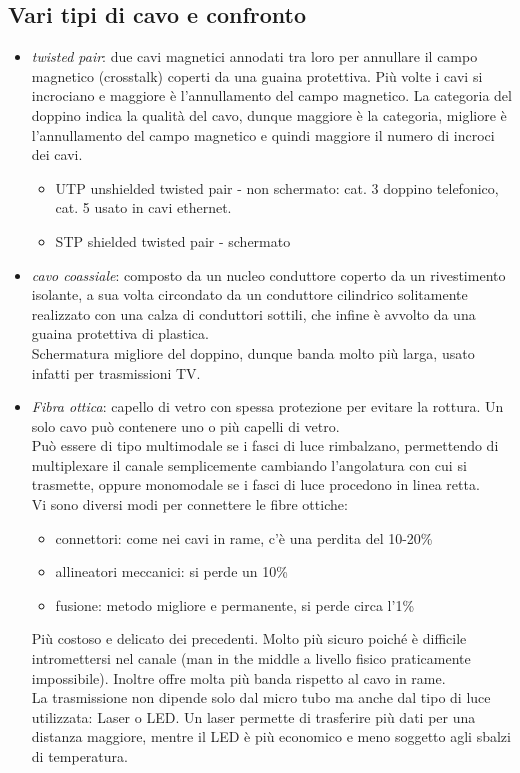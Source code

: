 \documentclass[10pt,a4paper,twoside]{article}
\begin{document}
\subsection{Vari tipi di cavo e confronto}
\begin{itemize}
\item \textit{twisted pair}: due cavi magnetici annodati tra loro per annullare il campo magnetico (crosstalk) coperti da una guaina protettiva. Più volte i cavi si incrociano e maggiore è l'annullamento del campo magnetico. La categoria del doppino indica la qualità del cavo, dunque maggiore è la categoria, migliore è l'annullamento del campo magnetico e quindi maggiore il numero di incroci dei cavi.
	\begin{itemize}
	\item UTP unshielded twisted pair - non schermato: cat. 3 doppino telefonico, cat. 5 usato in cavi ethernet.
	\item STP shielded twisted pair - schermato
	\end{itemize}
\item \textit{cavo coassiale}: composto da un nucleo conduttore coperto da un rivestimento isolante, a sua volta circondato da un conduttore cilindrico solitamente realizzato con una calza di conduttori sottili, che infine è avvolto da una guaina protettiva di plastica.\\
Schermatura migliore del doppino, dunque banda molto più larga, usato infatti per trasmissioni TV.
\item \textit{Fibra ottica}: capello di vetro con spessa protezione per evitare la rottura. Un solo cavo può contenere uno o più capelli di vetro.\\
Può essere di tipo multimodale se i fasci di luce rimbalzano, permettendo di multiplexare il canale semplicemente cambiando l'angolatura con cui si trasmette, oppure monomodale se i fasci di luce procedono in linea retta.\\
Vi sono diversi modi per connettere le fibre ottiche:
\begin{itemize}
	\item connettori: come nei cavi in rame, c'è una perdita del 10-20\%
	\item allineatori meccanici: si perde un 10\%
	\item fusione: metodo migliore e permanente, si perde circa l'1\%
\end{itemize}
Più costoso e delicato dei precedenti. Molto più sicuro poiché è difficile intromettersi nel canale (man in the middle a livello fisico praticamente impossibile). Inoltre offre molta più banda rispetto al cavo in rame.\\
La trasmissione non dipende solo dal micro tubo ma anche dal tipo di luce utilizzata: Laser o LED. Un laser permette di trasferire più dati per una distanza maggiore, mentre il LED è più economico e meno soggetto agli sbalzi di temperatura.
\end{itemize}
\end{document}
